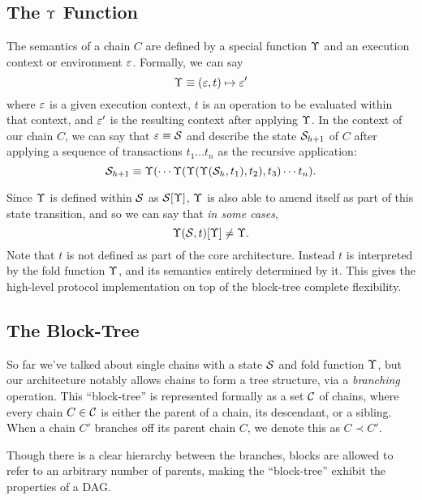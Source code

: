 \subsection{The $\Upsilon$ Function} \label{fold-function}

The semantics of a chain $C$ are defined by a special function $\Upsilon$ and an
execution context or environment $\varepsilon$. Formally, we can say
\[
    \Upsilon \equiv (\varepsilon, t) \mapsto \varepsilon'
\]
where $\varepsilon$ is a given execution context, $t$ is an operation to be evaluated
within that context, and $\varepsilon'$ is the resulting context after applying
$\Upsilon$.  In the context of our chain $C$, we can say that $\varepsilon \equiv \mathcal{S}$
and describe the state $\mathcal{S}_{h+1}$ of $C$ after applying a sequence of
transactions $t_1 \dots t_n$ as the recursive application:
\[
    \mathcal{S}_{h+1} \equiv \Upsilon(\cdots \Upsilon(\Upsilon(\Upsilon(\mathcal{S}_h,
    t_1), t_2), t_3) \cdots t_n).
\]

Since $\Upsilon$ is defined within $\mathcal{S}$ as $\mathcal{S}[\Upsilon]$, $\Upsilon$ is also
able to amend itself as part of this state transition, and so we can say that
\emph{in some cases},
\[
    \Upsilon(\mathcal{S}, t)[\Upsilon] \neq \Upsilon.
\]
Note that $t$ is not defined as part of the core architecture. Instead $t$ is
interpreted by the fold function $\Upsilon$, and its semantics entirely determined
by it. This gives the high-level protocol implementation on top of the block-tree
complete flexibility.

\subsection{The Block-Tree}

So far we've talked about single chains with a state $\mathcal{S}$ and fold function
$\Upsilon$, but our architecture notably allows chains to form a tree structure,
via a \emph{branching} operation. This ``block-tree'' is represented formally
as a set $\mathcal{C}$ of chains, where every chain $C \in \mathcal{C}$ is either the
parent of a chain, its descendant, or a sibling. When a chain $C'$ branches off
its parent chain $C$, we denote this as $C \prec C'$.

Though there is a clear hierarchy between the branches, blocks are allowed to
refer to an arbitrary number of parents, making the ``block-tree'' exhibit the
properties of a DAG.


